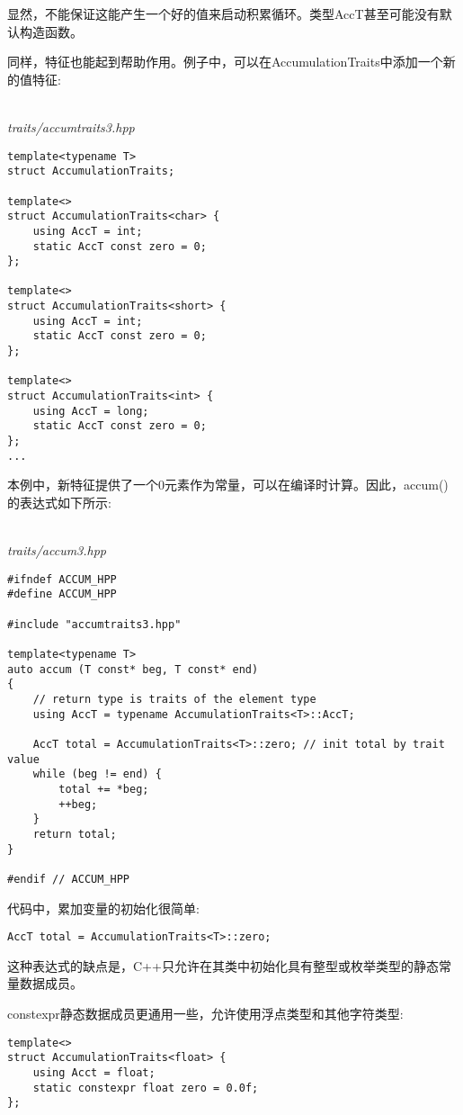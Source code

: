 显然，不能保证这能产生一个好的值来启动积累循环。类型AccT甚至可能没有默认构造函数。

同样，特征也能起到帮助作用。例子中，可以在AccumulationTraits中添加一个新的值特征:

\hspace*{\fill} \\ %
\noindent
\textit{traits/accumtraits3.hpp}
\begin{lstlisting}[style=styleCXX]
template<typename T>
struct AccumulationTraits;

template<>
struct AccumulationTraits<char> {
	using AccT = int;
	static AccT const zero = 0;
};

template<>
struct AccumulationTraits<short> {
	using AccT = int;
	static AccT const zero = 0;
};

template<>
struct AccumulationTraits<int> {
	using AccT = long;
	static AccT const zero = 0;
};
...
\end{lstlisting}

本例中，新特征提供了一个0元素作为常量，可以在编译时计算。因此，accum()的表达式如下所示:

\hspace*{\fill} \\ %
\noindent
\textit{traits/accum3.hpp}
\begin{lstlisting}[style=styleCXX]
#ifndef ACCUM_HPP
#define ACCUM_HPP

#include "accumtraits3.hpp"

template<typename T>
auto accum (T const* beg, T const* end)
{
	// return type is traits of the element type
	using AccT = typename AccumulationTraits<T>::AccT;
	
	AccT total = AccumulationTraits<T>::zero; // init total by trait value
	while (beg != end) {
		total += *beg;
		++beg;
	}
	return total;
}

#endif // ACCUM_HPP
\end{lstlisting}

代码中，累加变量的初始化很简单:

\begin{lstlisting}[style=styleCXX]
AccT total = AccumulationTraits<T>::zero;
\end{lstlisting}

这种表达式的缺点是，C++只允许在其类中初始化具有整型或枚举类型的静态常量数据成员。

constexpr静态数据成员更通用一些，允许使用浮点类型和其他字符类型:

\begin{lstlisting}[style=styleCXX]
template<>
struct AccumulationTraits<float> {
	using Acct = float;
	static constexpr float zero = 0.0f;
};
\end{lstlisting}

